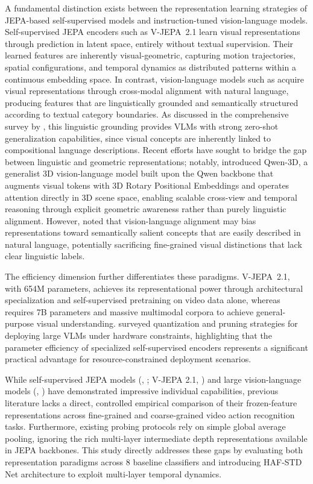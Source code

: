 A fundamental distinction exists between the representation learning strategies of JEPA-based self-supervised models and instruction-tuned vision-language models. Self-supervised JEPA encoders such as V-JEPA~2.1 \citep{murlabadia2026vjepa21} learn visual representations through prediction in latent space, entirely without textual supervision. Their learned features are inherently visual-geometric, capturing motion trajectories, spatial configurations, and temporal dynamics as distributed patterns within a continuous embedding space. In contrast, vision-language models such as \qwenvl{} \citep{bai2025qwen2vl, qwen2025qwen3vl} acquire visual representations through cross-modal alignment with natural language, producing features that are linguistically grounded and semantically structured according to textual category boundaries. As discussed in the comprehensive survey by \citet{bordes2024vlm}, this linguistic grounding provides VLMs with strong zero-shot generalization capabilities, since visual concepts are inherently linked to compositional language descriptions. Recent efforts have sought to bridge the gap between linguistic and geometric representations; notably, \citet{lin2026qwen3d} introduced Qwen-3D, a generalist 3D vision-language model built upon the Qwen backbone that augments visual tokens with 3D Rotary Positional Embeddings and operates attention directly in 3D scene space, enabling scalable cross-view and temporal reasoning through explicit geometric awareness rather than purely linguistic alignment. However, \citet{zhang2023vlmsurvey} noted that vision-language alignment may bias representations toward semantically salient concepts that are easily described in natural language, potentially sacrificing fine-grained visual distinctions that lack clear linguistic labels.

The efficiency dimension further differentiates these paradigms. V-JEPA~2.1, with 654M parameters, achieves its representational power through architectural specialization and self-supervised pretraining on video data alone, whereas \qwenvl{} requires 7B parameters and massive multimodal corpora to achieve general-purpose visual understanding. \citet{pathak2026efficientvlms} surveyed quantization and pruning strategies for deploying large VLMs under hardware constraints, highlighting that the parameter efficiency of specialized self-supervised encoders represents a significant practical advantage for resource-constrained deployment scenarios.


While self-supervised JEPA models (\vjepaa{}, \citep{assran2025vjepa2}; V-JEPA 2.1, \citep{murlabadia2026vjepa21}) and large vision-language models (\qwenvl{}, \citep{qwen2025qwen3vl}) have demonstrated impressive individual capabilities, previous literature lacks a direct, controlled empirical comparison of their frozen-feature representations across fine-grained and coarse-grained video action recognition tasks. Furthermore, existing probing protocols rely on simple global average pooling, ignoring the rich multi-layer intermediate depth representations available in JEPA backbones. This study directly addresses these gaps by evaluating both representation paradigms across 8 baseline classifiers and introducing HAF-STD Net architecture to exploit multi-layer temporal dynamics.

